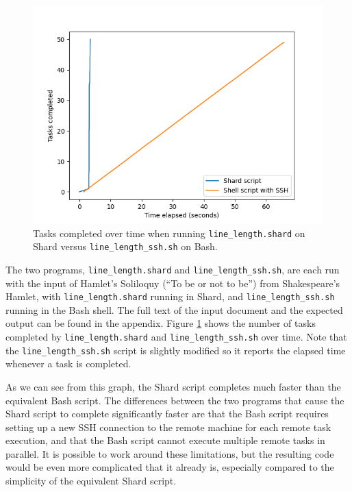 \documentclass[twoside]{report}
\begin{document}
\begin{figure}[h]
  \begin{center}
    \includegraphics[scale=0.9]{img/experiments/e12_1620960581241.png}
    \caption{Tasks completed over time when running \texttt{line\_length.shard} on Shard versus \texttt{line\_length\_ssh.sh} on Bash.}
    \label{fig:linelength}
  \end{center}
\end{figure}

The two programs, \texttt{line\_length.shard} and \texttt{line\_length\_ssh.sh}, are each run with the input of Hamlet's Soliloquy (``To be or not to be'') from Shakespeare's Hamlet, with \texttt{line\_length.shard} running in Shard, and \texttt{line\_length\_ssh.sh} running in the Bash shell.
The full text of the input document and the expected output can be found in the appendix.
Figure \ref{fig:linelength} shows the number of tasks completed by \texttt{line\_length.shard} and \texttt{line\_length\_ssh.sh} over time.
Note that the \texttt{line\_length\_ssh.sh} script is slightly modified so it reports the elapsed time whenever a task is completed.

As we can see from this graph, the Shard script completes much faster than the equivalent Bash script.
The differences between the two programs that cause the Shard script to complete significantly faster are that the Bash script requires setting up a new SSH connection to the remote machine for each remote task execution, and that the Bash script cannot execute multiple remote tasks in parallel.
It is possible to work around these limitations, but the resulting code would be even more complicated that it already is, especially compared to the simplicity of the equivalent Shard script.
\end{document}

